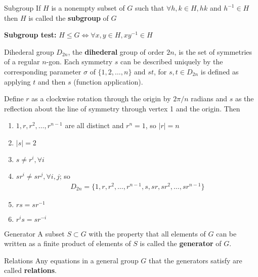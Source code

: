 \documentclass[titlepage, 12pt]{book}
\begin{document}
\begin{definition}{Subgroup}{}
  If $H$ is a nonempty subset of $G$ such that $\forall h, k\in H, hk$ and
    $h^{-1}\in H$ then $H$ is called the \textbf{subgroup} of $G$
\end{definition}

\textbf{Subgroup test:} $H\leq G\iff\forall x, y\in H, xy^{-1}\in H$

\begin{definition}{Dihederal group}{}
    $D_{2n}$, the \textbf{dihederal} group of order $2n$, is the set of
    symmetries of a regular $n$-gon. Each symmetry $s$ can be described uniquely
    by the corresponding parameter $\sigma$ of $\{1,2,\dots,n\}$ and $st$, for
    $s, t\in D_{2n}$ is defined as applying $t$ and then $s$ (function
    application).

    Define $r$ as a clockwise rotation through the origin by $2\pi/n$ radians
    and $s$ as the reflection about the line of symmetry through vertex 1 and
    the origin. Then

  \begin{enumerate}
      \item $1,r,r^2,\dots,r^{n-1}$ are all distinct and $r^n=1$, so $|r| = n$

      \item $|s| = 2$

      \item $s\neq r^i,\forall i$

      \item $sr^i\neq sr^j, \forall i, j$; so
        \begin{gather*}
          D_{2n} = \{1,r,r^2,\dots,r^{n-1},s,sr,sr^2,\dots,sr^{n-1}\}
        \end{gather*}

      \item $rs=sr^{-1}$

      \item $r^is=sr^{-i}$
  \end{enumerate}

\end{definition}

\begin{definition}{Generator}{}
  A subset $S\subset G$ with the property that all elements of $G$ can be
    written as a finite product of elements of $S$ is called the
    \textbf{generator} of $G$.
\end{definition}

\begin{definition}{Relations}{}
  Any equations in a general group $G$ that the generators satisfy are
    called \textbf{relations}.
\end{definition}
\end{document}
